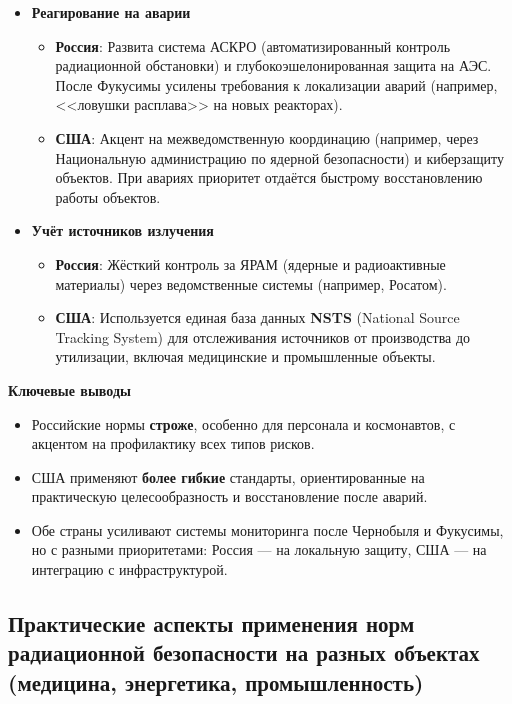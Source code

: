 \documentclass[a4paper, 14pt]{extarticle}
\begin{document}
\begin{itemize}
    \item \textbf{Реагирование на аварии}
          \begin{itemize}
              \item \textbf{Россия}: Развита система АСКРО (автоматизированный контроль радиационной обстановки) и глубокоэшелонированная защита на АЭС. После Фукусимы усилены требования к локализации аварий (например, <<ловушки расплава>> на новых реакторах).
              \item \textbf{США}: Акцент на межведомственную координацию (например, через Национальную администрацию по ядерной безопасности) и киберзащиту объектов. При авариях приоритет отдаётся быстрому восстановлению работы объектов.
          \end{itemize}

    \item \textbf{Учёт источников излучения}
          \begin{itemize}
              \item \textbf{Россия}: Жёсткий контроль за ЯРАМ (ядерные и радиоактивные материалы) через ведомственные системы (например, Росатом).
              \item \textbf{США}: Используется единая база данных \textbf{NSTS} (National Source Tracking System) для отслеживания источников от производства до утилизации, включая медицинские и промышленные объекты.
          \end{itemize}
\end{itemize}

\textbf{Ключевые выводы}
\begin{itemize}
    \item Российские нормы \textbf{строже}, особенно для персонала и космонавтов, с акцентом на профилактику всех типов рисков.
    \item США применяют \textbf{более гибкие} стандарты, ориентированные на практическую целесообразность и восстановление после аварий.
    \item Обе страны усиливают системы мониторинга после Чернобыля и Фукусимы, но с разными приоритетами: Россия --- на локальную защиту, США --- на интеграцию с инфраструктурой.
\end{itemize}


\subsection{Практические аспекты применения норм радиационной безопасности на разных объектах (медицина, энергетика, промышленность)}
\end{document}
